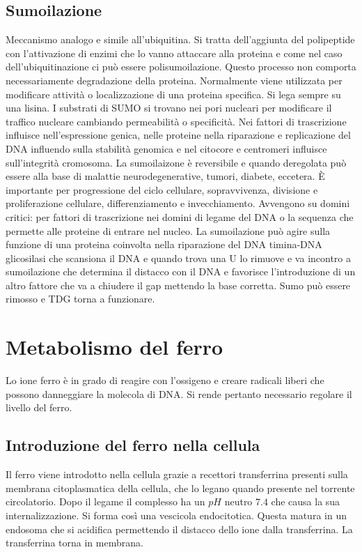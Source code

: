 	\subsection{Sumoilazione}
	Meccanismo analogo e simile all'ubiquitina. 
Si tratta dell'aggiunta del polipeptide con l'attivazione di enzimi che lo vanno attaccare alla proteina e come nel caso dell'ubiquitinazione
	ci pu\`o essere polisumoilazione. 
Questo processo non comporta necessariamente degradazione della proteina. 
Normalmente viene utilizzata per modificare attivit\`a o localizzazione di una
	proteina specifica. 
Si lega sempre su una lisina. 
I substrati di SUMO si trovano nei pori nucleari per modificare il traffico nucleare cambiando permeabilit\`a o specificit\`a. 
Nei 
	fattori di trascrizione influisce nell'espressione genica, nelle proteine nella riparazione e replicazione del DNA influendo sulla stabilit\`a genomica e nel citocore e centromeri 
	influisce sull'integrit\`a cromosoma. 
La sumoilaizone \`e reversibile e quando deregolata pu\`o essere alla base di malattie neurodegenerative, tumori, diabete, eccetera. 
\`E importante
	per progressione del ciclo cellulare, sopravvivenza, divisione e proliferazione cellulare, differenziamento e invecchiamento. 
Avvengono su domini critici: per fattori di trascrizione
	nei domini di legame del DNA o la sequenza che permette alle proteine di entrare nel nucleo. 
La sumoilazione pu\`o agire sulla funzione di una proteina coinvolta nella riparazione del
	DNA timina-DNA glicosilasi che scansiona il DNA e quando trova una U lo rimuove e va incontro a sumoilazione che determina il distacco con il DNA e favorisce l'introduzione di un altro
	fattore che va a chiudere il gap mettendo la base corretta. 
Sumo pu\`o essere rimosso e TDG torna a funzionare. 

		
\section{Metabolismo del ferro}
Lo ione ferro \`e in grado di reagire con l'ossigeno e creare radicali liberi che possono danneggiare la molecola di DNA.
Si rende pertanto necessario regolare il livello del ferro.

	\subsection{Introduzione del ferro nella cellula}
	Il ferro viene introdotto nella cellula grazie a recettori transferrina presenti sulla membrana citoplasmatica della cellula, che lo legano quando presente nel torrente circolatorio.
	Dopo il legame il complesso ha un $pH$ neutro $7.4
$ che causa la sua internalizzazione.
	Si forma cos\`i una vescicola endocitotica.
	Questa matura in un endosoma che si acidifica permettendo il distacco dello ione dalla transferrina.
	La transferrina torna in membrana.


